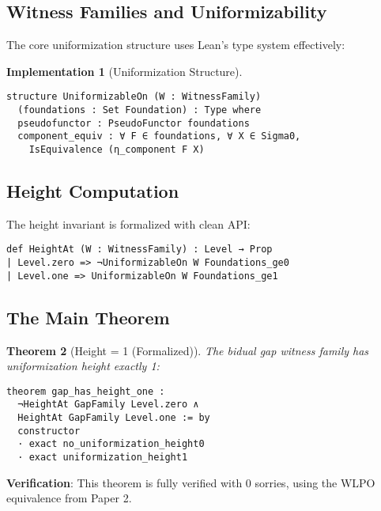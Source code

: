 \documentclass[11pt]{article}
\newtheorem{theorem}{Theorem}[section]
\theoremstyle{definition}
\newtheorem{implementation}[theorem]{Implementation}
\theoremstyle{remark}
\begin{document}
\subsection{Witness Families and Uniformizability}

The core uniformization structure uses Lean's type system effectively:

\begin{implementation}[Uniformization Structure]
\begin{lstlisting}[language={}]
structure UniformizableOn (W : WitnessFamily) 
  (foundations : Set Foundation) : Type where
  pseudofunctor : PseudoFunctor foundations
  component_equiv : ∀ F ∈ foundations, ∀ X ∈ Sigma0,
    IsEquivalence (η_component F X)
\end{lstlisting}
\end{implementation}

\subsection{Height Computation}

The height invariant is formalized with clean API:

\begin{lstlisting}[language={}]
def HeightAt (W : WitnessFamily) : Level → Prop
| Level.zero => ¬UniformizableOn W Foundations_ge0
| Level.one => UniformizableOn W Foundations_ge1
\end{lstlisting}

\subsection{The Main Theorem}

\begin{theorem}[Height = 1 (Formalized)]
The bidual gap witness family has uniformization height exactly 1:
\begin{lstlisting}[language={}]
theorem gap_has_height_one : 
  ¬HeightAt GapFamily Level.zero ∧ 
  HeightAt GapFamily Level.one := by
  constructor
  · exact no_uniformization_height0
  · exact uniformization_height1
\end{lstlisting}
\end{theorem}

\begin{mdframed}[style=achievement]
\textbf{Verification}: This theorem is fully verified with 0 sorries, using the WLPO equivalence from Paper 2.
\end{mdframed}
\end{document}
